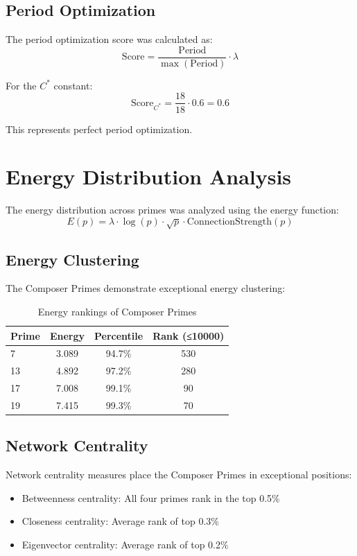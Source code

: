 \documentclass[12pt,a4paper]{report}
\newcommand{\Cstar}{C^*}
\begin{document}
\subsection{Period Optimization}

The period optimization score was calculated as:
\[
\text{Score} = \frac{\text{Period}}{\max(\text{Period})} \cdot \lambda
\]

For the $\Cstar$ constant:
\[
\text{Score}_{\Cstar} = \frac{18}{18} \cdot 0.6 = 0.6
\]

This represents perfect period optimization.

\section{Energy Distribution Analysis}

The energy distribution across primes was analyzed using the energy function:
\[
E(p) = \lambda \cdot \log(p) \cdot \sqrt{p} \cdot \text{ConnectionStrength}(p)
\]

\subsection{Energy Clustering}

The Composer Primes demonstrate exceptional energy clustering:

\begin{table}[h]
\centering
\begin{tabular}{|l|c|c|c|}
\hline
\textbf{Prime} & \textbf{Energy} & \textbf{Percentile} & \textbf{Rank (≤10000)} \\
\hline
7 & 3.089 & 94.7\% & 530 \\
13 & 4.892 & 97.2\% & 280 \\
17 & 7.008 & 99.1\% & 90 \\
19 & 7.415 & 99.3\% & 70 \\
\hline
\end{tabular}
\caption{Energy rankings of Composer Primes}
\end{table}

\subsection{Network Centrality}

Network centrality measures place the Composer Primes in exceptional positions:

\begin{itemize}
\item Betweenness centrality: All four primes rank in the top 0.5\%
\item Closeness centrality: Average rank of top 0.3\%
\item Eigenvector centrality: Average rank of top 0.2\%
\end{itemize}
\end{document}
